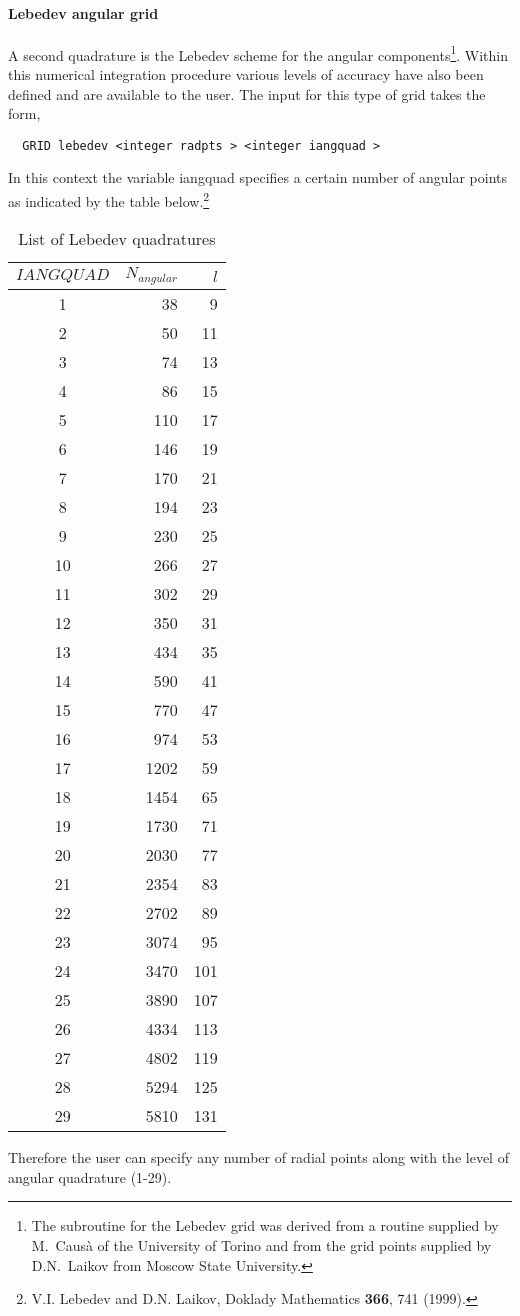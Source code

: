 \paragraph{Lebedev angular grid}

A second quadrature is the Lebedev
scheme for the angular components\footnote{The subroutine 
for the Lebedev grid was derived from a routine supplied by M.~Caus\`a
of the University of Torino and from the grid points supplied by
D.N.~Laikov from Moscow State University.}.  
Within this numerical integration procedure various levels 
of accuracy have also been defined and are available to the user.  
The input for this type of grid takes the form,
\begin{verbatim}
  GRID lebedev <integer radpts > <integer iangquad > 
\end{verbatim}
In this context the variable iangquad specifies a certain number of
angular points as indicated by the table below.\footnote{
V.I. Lebedev and D.N. Laikov, Doklady Mathematics {\bf 366}, 741
(1999).
}
\begin{table}[htp]
\begin{center}
\begin{tabular}[right]{|c|rr|} \hline
$IANGQUAD$ & $N_{angular}$ & $l$\\
\hline
 1&   38&   9  \\
 2&   50&  11  \\
 3&   74 & 13  \\
 4&   86 & 15  \\
 5&  110 & 17  \\
 6&  146 & 19  \\
 7&  170 & 21  \\
 8&  194 & 23  \\
 9&  230 & 25  \\
10&  266&  27  \\
11&  302&  29  \\
12&  350&  31  \\
13&  434&  35  \\
14&  590&  41  \\
15&  770&  47  \\
16&  974&  53  \\
17& 1202&  59  \\
18& 1454&   65 \\
19& 1730&   71 \\
20& 2030&   77 \\
21& 2354&   83 \\
22& 2702&   89 \\ 
23& 3074&   95 \\
24& 3470&  101 \\
25& 3890&  107 \\
26& 4334&  113 \\
27& 4802&  119 \\
28& 5294&  125 \\
29& 5810&  131 \\
\hline
\end{tabular}
\end{center}
\caption{List of Lebedev quadratures}
\end{table}
Therefore the user can specify any number of radial points along with
the level of angular quadrature (1-29).

